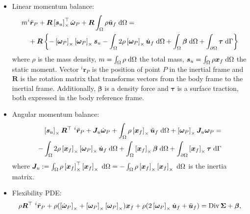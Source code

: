\begin{itemize}
	\item Linear momentum balance:
	\begin{equation}
	\label{eq:ffb_tr_class}
	\begin{split}
	&m ^{i}\ddot{\bm{r}}_P + \bm{R} \crmat{\bm{s}_u}^\top \dot{\bm{\omega}}_P  + \bm{R} \int_{\Omega} \rho \ddot{\bm{u}}_f \d{\Omega} = \\
	&\quad + \bm{R} \left\{ -\crmat{\bm{\omega}_P} \crmat{\bm{\omega}_P} \bm{s}_u -  \int_{\Omega} 2 \rho \crmat{\bm{\omega}_P} \dot{\bm{u}}_f \d{\Omega} +  \int_{\Omega} \bm\beta \d{\Omega} +  \int_{\partial \Omega} \bm\tau \d{\Gamma}  \right\} 
	\end{split}
	\end{equation}
	where $\rho$ is the mass density, $m = \int_{\Omega} \rho \d{\Omega}$ the total mass,  $\bm{s}_u = \int_{\Omega} \rho \bm{x}_f \d{\Omega}$ the static moment. Vector $^{i}{\bm{r}}_P$ is the position of point $P$ in the inertial frame and $\bm{R}$ is the rotation matrix that transforms vectors from the body frame to the inertial frame. Additionally, $\bm\beta$ is a density force and $\bm\tau$ is a surface traction, both expressed in the body reference frame.
	\item Angular momentum balance:
	\begin{equation}
	\label{eq:ffb_rot_class}
	\begin{split}
	\crmat{\bm{s}_u} {\bm{R}^{\top}} \ ^{i}\ddot{\bm{r}}_P + \bm{J}_u \dot{\bm\omega}_P + \int_{\Omega} \rho \crmat{\bm{x}_f} \ddot{\bm{u}}_f \d{\Omega} + \crmat{\bm{\omega}_P} \bm{J}_u \bm{\omega}_P = \\ 
	- \int_{\Omega} 2\rho \crmat{\bm{x}_f} \crmat{\bm\omega_P} \dot{\bm{u}}_f \d{\Omega} + \int_{\Omega}\crmat{\bm{x}_f} \bm\beta \d{\Omega} + \int_{\partial \Omega}\crmat{\bm{x}_f} \bm\tau \d{\Gamma} \\
	\end{split}
	\end{equation}
	where $\bm{J}_u:= \int_{\Omega} \rho \crmat{\bm{x}_f}^\top\crmat{\bm{x}_f} \d{\Omega}= - \int_{\Omega} \rho \crmat{\bm{x}_f}\crmat{\bm{x}_f} \d{\Omega}$ is the inertia matrix.
	\item Flexibility PDE:
	\begin{equation}
	\label{eq:ffb_flex_class}
	\rho  {\bm{R}^{\top}} \ ^{i}\ddot{\bm{r}}_P + \rho (\crmat{\dot{\bm\omega}_P} + \crmat{\bm{\omega}_P}\crmat{\bm{\omega}_P})\bm{x}_f + \rho (2 \crmat{\bm{\omega}_P} \dot{\bm{u}}_f + \ddot{\bm{u}}_f) = \Div{\bm\Sigma} + \bm\beta,

\end{equation}
\end{itemize}
